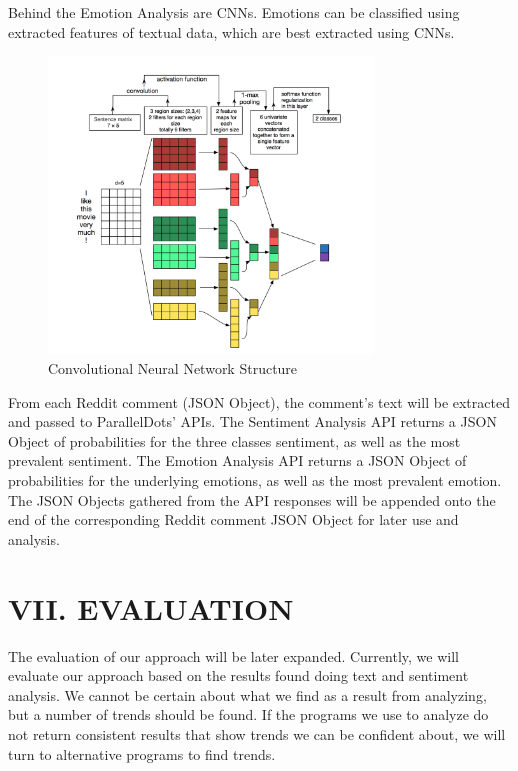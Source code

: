 \documentclass[letterpaper]{article}
\begin{document}
\newpage

Behind the Emotion Analysis are CNNs. Emotions can be classified using extracted features of textual data, which are best extracted using CNNs.

\begin{figure}[!htb]
\begin{center}
\includegraphics[width=3.4in]{cnn.png}
\caption{Convolutional Neural Network Structure}
\label{fig2}
\end{center}
\end{figure}

From each Reddit comment (JSON Object), the comment’s text will be extracted and passed to ParallelDots’ APIs. The Sentiment Analysis API returns a JSON Object of probabilities for the three classes sentiment, as well as the most prevalent sentiment. The Emotion Analysis API returns a JSON Object of probabilities for the underlying emotions, as well as the most prevalent emotion. The JSON Objects gathered from the API responses will be appended onto the end of the corresponding Reddit comment JSON Object for later use and analysis.

\section{VII. EVALUATION}

The evaluation of our approach will be later expanded. Currently, we will evaluate our approach based on the results found doing text and sentiment analysis. We cannot be certain about what we find as a result from analyzing, but a number of trends should be found. If the programs we use to analyze do not return consistent results that show trends we can be confident about, we will turn to alternative programs to find trends.
\end{document}
